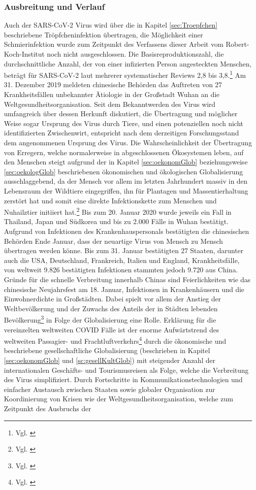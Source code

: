 \documentclass[12pt]{article}
\begin{document}
\subsubsection{Ausbreitung und Verlauf} \label{subsec:Cov-Ausbreitung}
Auch der SARS-CoV-2 Virus wird über die in Kapitel \ref{sec:Troepfchen} beschriebene Tröpfcheninfektion übertragen, die Möglichkeit einer Schmierinfektion wurde zum Zeitpunkt des Verfassens dieser Arbeit vom Robert-Koch-Institut noch nicht ausgeschlossen. Die Basisreproduktionszahl, die durchschnittliche Anzahl, der von einer infizierten Person angesteckten Menschen, beträgt für SARS-CoV-2 laut mehrerer systematischer Reviews 2,8 bis 3,8.\footnote{Vgl. \cite{Rki21}} Am 31. Dezember 2019 meldeten chinesische Behörden das Auftreten von 27 Krankheitsfällen unbekannter Ätiologie in der Großstadt Wuhan an die Weltgesundheitsorganisation. Seit dem Bekanntwerden des Virus wird umfangreich über dessen Herkunft diskutiert, die Übertragung und möglicher Weise sogar Ursprung des Virus durch Tiere, und einen potenziellen noch nicht identifizierten Zwischenwirt, entspricht nach dem derzeitigen Forschungsstand dem angenommenen Ursprung des Virus. Die Wahrscheinlichkeit der Übertragung von Erregern, welche normalerweise in abgeschlossenen Ökosystemen leben, auf den Menschen steigt aufgrund der in Kapitel \ref{sec:oekonomGlob} beziehungsweise \ref{sec:oekologGlob} beschriebenen ökonomischen und ökologischen Globalisierung ausschlaggebend, da der Mensch vor allem im letzten Jahrhundert massiv in den Lebensraum der Wildtiere eingegriffen, ihn für Plantagen und Massentierhaltung zerstört hat und somit eine direkte Infektionskette zum Menschen und Nuhailztier initiiert hat.\footnote{Vgl. \cite{Schm21}}  Bis zum 20. Januar 2020 wurde jeweils ein Fall in Thailand, Japan und Südkorea und bis zu 2.000 Fälle in Wuhan bestätigt. Aufgrund von Infektionen des Krankenhauspersonals bestätigten die chinesischen Behörden Ende Januar, dass der neuartige Virus von Mensch zu Mensch übertragen werden könne. Bis zum 31. Januar bestätigten 27 Staaten, darunter auch die USA, Deutschland, Frankreich, Italien und England, Krankheitsfälle, von weltweit 9.826 bestätigten Infektionen stammten jedoch 9.720 aus China. Gründe für die schnelle Verbreitung innerhalb Chinas sind Feierlichkeiten wie das chinesische Neujahrsfest am 18. Januar, Infektionen in Krankenhäusern und die Einwohnerdichte in Großstädten. Dabei spielt vor allem der Anstieg der Weltbevölkerung und der Zuwachs des Anteils der in Städten lebenden Bevölkerung\footnote{Vgl. \cite{Städt22}} in Folge der Globalisierung eine Rolle. Erklärung für die vereinzelten weltweiten COVID Fälle ist der enorme Aufwärtstrend des weltweiten Passagier- und Frachtluftverkehrs\footnote{Vgl. \cite{Keller22}} durch die ökonomische und beschriebene gesellschaftliche Globalisierung (beschrieben in Kapitel \ref{sec:oekonomGlob} und \ref{sc:gesellKultGlob}) mit steigender Anzahl der internationalen Geschäfts- und Tourismusreisen als Folge, welche die Verbreitung des Virus simplifiziert. Durch Fortschritte in Kommunikationstechnologien und einfacher Austausch zwischen Staaten sowie globaler Organisation zur Koordinierung von Krisen wie der Weltgesundheitsorganisation, welche zum Zeitpunkt des Ausbruchs der 
\end{document}
